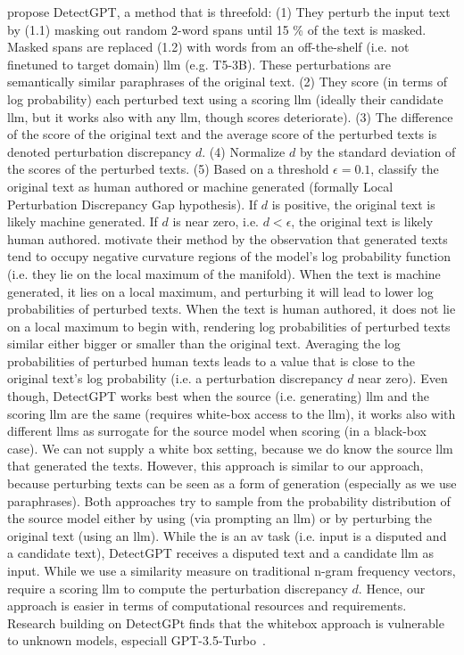 \citet{mitchell_detectgpt_2023} propose DetectGPT, a method that is threefold:
(1) They perturb the input text by (1.1) masking out random 2-word spans until 15 \% of the text is masked. 
Masked spans are replaced (1.2) with words from an off-the-shelf (i.e. not finetuned to target domain) \ac{llm} (e.g. T5-3B). 
These perturbations are semantically similar paraphrases of the original text.
(2) They score (in terms of log probability) each perturbed text using a scoring \ac{llm} 
(ideally their candidate \ac{llm}, but it works also with any \ac{llm}, though scores deteriorate). 
(3) The difference of the score of the original text and the average score of the perturbed texts is denoted perturbation discrepancy $d$. 
(4) Normalize $d$ by the standard deviation of the scores of the perturbed texts.
(5) Based on a threshold $\epsilon=0.1$, classify the original text as human authored or machine generated 
(formally Local Perturbation Discrepancy Gap hypothesis).
If $d$ is positive, the original text is likely machine generated.
If $d$ is near zero, i.e. $d < \epsilon$, the original text is likely human authored.
\citet{mitchell_detectgpt_2023} motivate their method by the observation that generated texts tend to occupy 
negative curvature regions of the model's log probability function (i.e. they lie on the local maximum of the manifold).
When the text is machine generated, it lies on a local maximum, 
and perturbing it will lead to lower log probabilities of perturbed texts.
When the text is human authored, it does not lie on a local maximum to begin with, 
rendering log probabilities of perturbed texts similar either bigger or smaller than the original text.
Averaging the log probabilities of perturbed human texts leads to a value that is 
close to the original text's log probability (i.e. a perturbation discrepancy $d$ near zero).
Even though, DetectGPT works best when the source (i.e. generating) \ac{llm} and the scoring \ac{llm} are the same 
(requires white-box access to the \ac{llm}), 
it works also with different \acp{llm} as surrogate for the source model when scoring (in a black-box case).
We can not supply a white box setting, because we do know the source \ac{llm} that generated the \imp{} texts.
However, this approach is similar to our approach, because perturbing texts can be seen as a 
form of \imp{} generation (especially as we use paraphrases). 
Both approaches try to sample from the probability distribution of the source model either 
by using \imps{} (via prompting an \ac{llm}) or by perturbing the original text (using an \ac{llm}).
While the \impAppr{} is an \ac{av} task (i.e. input is a disputed and a candidate text), 
DetectGPT receives a disputed text and a candidate \ac{llm} as input.
While we use a similarity measure on traditional n-gram frequency vectors, 
\citet{mitchell_detectgpt_2023} require a scoring \ac{llm} to compute the perturbation discrepancy $d$.
Hence, our approach is easier in terms of computational resources and requirements.
Research building on DetectGPt finds that the whitebox approach is vulnerable to unknown models, especiall GPT-3.5-Turbo~\citep{Wu_ODD_challenges_2025}.

